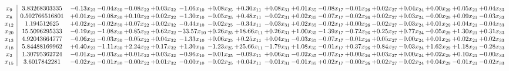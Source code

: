\documentclass[9pt]{article}
\begin{document}
 \[\begin{array}{c| c c@{\hskip 2pt} c@{\hskip 2pt} c@{\hskip 2pt} c@{\hskip 2pt} c@{\hskip 2pt} c@{\hskip 2pt} c@{\hskip 2pt} c@{\hskip 2pt} c@{\hskip 2pt} c@{\hskip 2pt} c@{\hskip 2pt} c@{\hskip 2pt} c@{\hskip 2pt} c@{\hskip 2pt} c@{\hskip 2pt} c@{\hskip 2pt} }
 x_{9}   &  3.83268303335 & -0.13 x_{23} & -0.04 x_{30} & -0.08 x_{22} & +  0.03 x_{32} & -1.06 x_{10} & +  0.08 x_{25} & +  0.30 x_{11} & +  0.08 x_{31} & +  0.01 x_{35} & -0.08 x_{17} & -0.01 x_{26} & +  0.02 x_{27} & +  0.04 x_{24} & +  0.00 x_{29} & +  0.05 x_{21} & +  0.04 x_{33}\\
 x_{8}   &  0.502766516801 & +  0.01 x_{23} & -0.08 x_{30} & +  0.10 x_{22} & +  0.02 x_{32} & -1.30 x_{10} & -0.05 x_{25} & +  0.48 x_{11} & -0.02 x_{31} & +  0.02 x_{35} & -0.07 x_{17} & -0.02 x_{26} & +  0.02 x_{27} & +  0.03 x_{24} & -0.00 x_{29} & +  0.09 x_{21} & -0.03 x_{33}\\
 x_{12}   &  1.194512625 & +  0.02 x_{23} & -0.02 x_{30} & +  0.07 x_{22} & +  0.02 x_{32} & -0.44 x_{10} & -0.02 x_{25} & -0.34 x_{11} & -0.03 x_{31} & +  0.02 x_{35} & -0.02 x_{17} & +  0.00 x_{26} & -0.02 x_{27} & -0.03 x_{24} & +  0.01 x_{29} & +  0.04 x_{21} & -0.04 x_{33}\\
 x_{20}   &  15.5096295333 & -0.19 x_{23} & -1.08 x_{30} & +  0.85 x_{22} & +  0.62 x_{32} & -33.57 x_{10} & +  0.26 x_{25} & + 18.66 x_{11} & +  0.26 x_{31} & +  1.00 x_{35} & -1.39 x_{17} & -0.72 x_{26} & +  0.25 x_{27} & +  0.77 x_{24} & -0.05 x_{29} & +  1.30 x_{21} & +  0.31 x_{33}\\
 x_{13}   &  4.92043664777 & -0.06 x_{23} & -0.03 x_{30} & -0.05 x_{22} & +  0.04 x_{32} & -1.33 x_{10} & +  0.06 x_{25} & +  0.25 x_{11} & +  0.04 x_{31} & -0.03 x_{35} & -0.07 x_{17} & -0.01 x_{26} & +  0.05 x_{27} & -0.00 x_{24} & +  0.01 x_{29} & +  0.02 x_{21} & +  0.02 x_{33}\\
 x_{18}   &  5.84488169962 & +  0.40 x_{23} & -1.11 x_{30} & +  2.24 x_{22} & +  0.17 x_{32} & +  1.30 x_{10} & -1.23 x_{25} & + 25.66 x_{11} & -1.79 x_{31} & +  1.08 x_{35} & -0.01 x_{17} & +  0.37 x_{26} & +  0.84 x_{27} & -0.03 x_{24} & +  1.62 x_{29} & +  1.18 x_{21} & -0.28 x_{33}\\
 x_{2}   &  1.30795362724 & -0.01 x_{23} & -0.03 x_{30} & +  0.01 x_{22} & +  0.03 x_{32} & -0.96 x_{10} & -0.01 x_{25} & -0.09 x_{11} & +  0.06 x_{31} & -0.02 x_{35} & -0.07 x_{17} & +  0.00 x_{26} & +  0.03 x_{27} & +  0.00 x_{24} & +  0.02 x_{29} & +  0.10 x_{21} & -0.00 x_{33}\\
 x_{15}   &  3.6017842281 & -0.02 x_{23} & -0.01 x_{30} & -0.00 x_{22} & +  0.01 x_{32} & -0.00 x_{10} & -0.02 x_{25} & +  0.04 x_{11} & -0.01 x_{31} & -0.01 x_{35} & +  0.02 x_{17} & -0.00 x_{26} & +  0.02 x_{27} & -0.02 x_{24} & +  0.04 x_{29} & -0.01 x_{21} & -0.02 x_{33}\\

\end{array}\]
\end{document}
